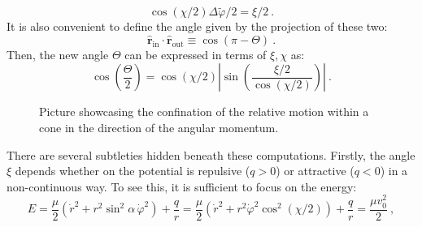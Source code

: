 \documentclass[a4paper,11pt]{article}
\begin{document}
\begin{equation}
    \cos(\chi/2)\Delta\tilde{\varphi}/2 = \xi/2\ .
\end{equation}
It is also convenient to define the angle given by the projection of these two:
\begin{equation}
    \hat{\boldsymbol r}_{\text{in}} \cdot \hat{\boldsymbol r}_{\text{out}} \equiv \cos(\pi - \Theta)\ .
\end{equation}
Then, the new angle $\Theta$ can be expressed in terms of $\xi, \chi$ as:
\begin{equation}
    \cos\left(\frac{\Theta}{2}\right) = \cos(\chi/2)\left|\sin\left(\frac{\xi/2}{\cos(\chi/2)}\right)\right|\ .
\end{equation}
\begin{figure}[ht!]
    \centering 
\caption{Picture showcasing the confination of the relative motion within a cone in the direction of the angular momentum.}
\label{cone}
\end{figure}

There are several subtleties hidden beneath these computations. Firstly, the angle $\xi$ depends whether on the potential is repulsive ($q > 0$) or attractive ($q < 0$) in a non-continuous way. To see this, it is sufficient to focus on the energy:
\begin{equation}
    E = \frac{\mu}{2}(\dot{r}^2 + r^2\sin^2\alpha\,\dot{\varphi}^2) + \frac{q}{r}= \frac{\mu}{2}(\dot{r}^2 + r^2\dot{\varphi}^2\cos^2(\chi/2)) + \frac{q}{r} = \frac{\mu v_0^2}{2}\ ,
\end{equation}
\end{document}
